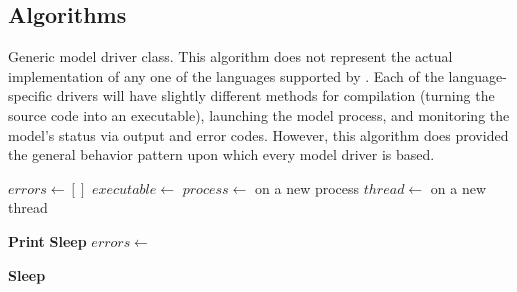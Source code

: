 \documentclass[journal]{IEEEtran}
\newcommand{\todo}[1]{{\color{red}{#1}}}
\newcommand{\pkg}{{\tt \todo{cis\_interface}}{}}
\begin{document}
\newpage
%
\begin{appendices}

\section{Algorithms}\label{A:algorithms}

\begin{algorithm}[H]
    \caption{Generic model driver class. This algorithm does not represent the actual implementation of any one of the languages supported by {\pkg}. Each of the language-specific drivers will have slightly different methods for compilation (turning the source code into an executable), launching the model process, and monitoring the model's status via output and error codes. However, this algorithm does provided the general behavior pattern upon which every model driver is based.}
    \label{alg:model}
    \begin{algorithmic}[1]
    	\State $errors \gets []$
    	\State $executable \gets$ 
	\State $process \gets$  on a new process
	\State $thread \gets$  on a new thread
	\item[]
		\State {}
	\EndClassMethod
	\item[]
				\State \textbf{Print} 
			\Else
				\State \textbf{Sleep}
			\EndIf
		\EndWhile
			\State $errors \gets$ 
		\EndIf
	\EndClassMethod
	\item[]
		\State {}
	\EndClassMethod
	\item[]
			\State \textbf{Sleep}
		\EndWhile
		\State {}
	\EndClassMethod
	\item[]
    \EndClass
    \end{algorithmic}
\end{algorithm}


\end{appendices}
\end{document}
